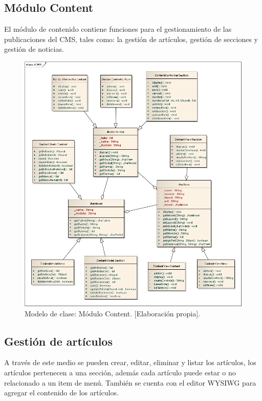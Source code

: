 \subsection{M\'odulo Content}
El m\'odulo de contenido contiene funciones para el gestionamiento de las publicaciones del CMS, tales como: la gesti\'on de art\'iculos, gesti\'on de secciones y gesti\'on de noticias.

\begin{figure}[h]
\centering
\includegraphics[scale=.4, keepaspectratio=true]{imagenes/14_imagen.png}
\caption{Modelo de clase: M\'odulo Content. [Elaboraci\'on propia].}
\end{figure}

\subsection{Gesti\'on de art\'iculos}
A trav\'es de este medio se pueden crear, editar, eliminar y listar los art\'iculos, los art\'iculos pertenecen a una secci\'on, adem\'as cada art\'iculo puede estar o no relacionado a un item de men\'u. Tambi\'en se cuenta con el editor WYSIWG para agregar el contenido de los art\'iculos.

